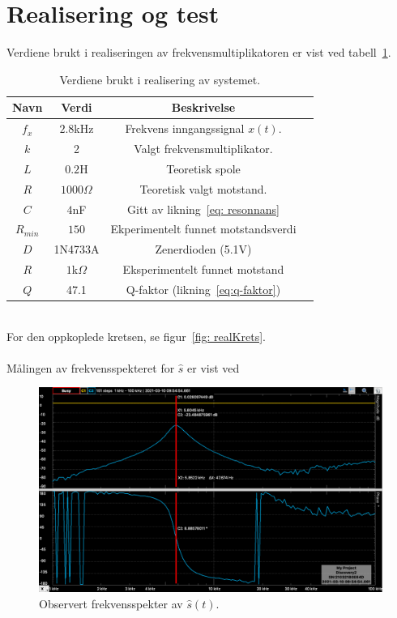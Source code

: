 \documentclass[a4paper,11pt,norsk]{article}
\begin{document}
\section{Realisering og test}
\label{sec:realisering}
Verdiene brukt i realiseringen av frekvensmultiplikatoren er vist ved tabell~\ref{table:variabler}.
\\
\begin{table}[htbp]
\centering
\begin{tabular}{ |c|c|c|c| } 
\hline
\textbf{Navn} & \textbf{Verdi} & \textbf{Beskrivelse}\\
\hline
$f_x$ & $2.8$kHz & Frekvens inngangssignal $x(t)$.  \\
\hline
$k$ & 2 & Valgt frekvensmultiplikator. \\
\hline
$L$ & $0.2$H & Teoretisk spole\\
\hline
$R$ & $1000 \Omega$ & Teoretisk valgt motstand.  \\ 
\hline
$C$ & $4$nF & Gitt av likning~\ref{eq: resonnans} \\ 
\hline
$R_{min}$ & $150$ & Ekperimentelt funnet motstandsverdi \\
\hline
$D$ & 1N4733A & Zenerdioden (5.1V) \\
\hline
$R$ & $1$k$\Omega$ & Eksperimentelt funnet motstand \\
\hline
$Q$ & 47.1 & Q-faktor (likning~\ref{eq:q-faktor})\\
\hline
\end{tabular}
\caption{Verdiene brukt i realisering av systemet.}
\label{table:variabler}
\end{table}
\\
For den oppkoplede kretsen, se figur~\ref{fig: realKrets}. \\\\
Målingen av frekvensspekteret for $\hat{s}$ er vist ved 
\begin{figure}[htbp]
\centering
\includegraphics[width=1.0\textwidth]{img/Network_Waveforms_img.png}
\caption{Observert frekvensspekter av $\hat{s}(t)$.}
\end{figure}\label{fig: frekvensspekter}
\end{document}
